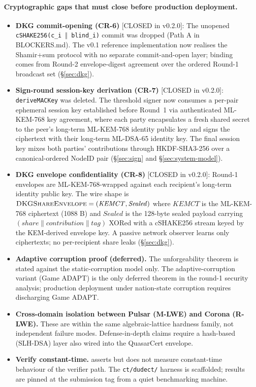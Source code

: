 \documentclass[11pt,a4paper]{article}
\theoremstyle{definition}
\theoremstyle{remark}
\begin{document}
\paragraph{Cryptographic gaps that must close before production
deployment.}

\begin{itemize}[leftmargin=*, itemsep=0pt]
\item \textbf{DKG commit-opening (CR-6)} [CLOSED in v0.2.0]: The
unopened \texttt{cSHAKE256(c\_i $\Vert$ blind\_i)} commit was
dropped (Path A in BLOCKERS.md). The v0.1 reference implementation
now realises the Shamir+sum protocol with no separate commit-and-open
layer; binding comes from Round-2 envelope-digest agreement over the
ordered Round-1 broadcast set (\S\ref{sec:dkg}).
\item \textbf{Sign-round session-key derivation (CR-7)} [CLOSED in
v0.2.0]: \texttt{deriveMACKey} was deleted. The threshold signer now
consumes a per-pair ephemeral session key established before Round~1
via authenticated ML-KEM-768 key agreement, where each party
encapsulates a fresh shared secret to the peer's long-term ML-KEM-768
identity public key and signs the ciphertext with their long-term
ML-DSA-65 identity key. The final session key mixes both parties'
contributions through HKDF-SHA3-256 over a canonical-ordered NodeID
pair (\S\ref{sec:sign} and \S\ref{sec:system-model}).
\item \textbf{DKG envelope confidentiality (CR-8)} [CLOSED in v0.2.0]:
Round-1 envelopes are ML-KEM-768-wrapped against each recipient's
long-term identity public key. The wire shape is
$\textsc{DKGShareEnvelope} = (\mathit{KEMCT}, \mathit{Sealed})$ where
$\mathit{KEMCT}$ is the ML-KEM-768 ciphertext (1088 B) and
$\mathit{Sealed}$ is the 128-byte sealed payload carrying
$(\mathit{share} \| \mathit{contribution} \| \mathit{tag})$ XORed with
a cSHAKE256 stream keyed by the KEM-derived envelope key. A passive
network observer learns only ciphertexts; no per-recipient share
leaks (\S\ref{sec:dkg}).
\item \textbf{Adaptive corruption proof (deferred).} The
 unforgeability theorem is stated against the
static-corruption model only. The adaptive-corruption variant
(Game ADAPT) is the only deferred theorem in the round-1 security
analysis; production deployment under nation-state corruption requires
discharging Game ADAPT.
\item \textbf{Cross-domain isolation between Pulsar (M-LWE) and
Corona (R-LWE).} These are within the same algebraic-lattice
hardness family, not independent failure modes. Defense-in-depth
claims require a hash-based (SLH-DSA) layer also wired into the
QuasarCert envelope.
\item \textbf{Verify constant-time.}  asserts but
does not measure constant-time behaviour of the verifier path. The
\texttt{ct/dudect/} harness is scaffolded; results are pinned at
the submission tag from a quiet benchmarking machine.
\end{itemize}
\end{document}
